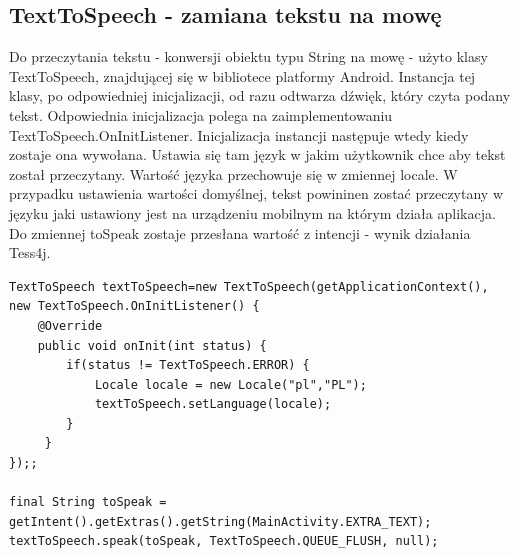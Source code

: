 \documentclass[eng,oneside]{mgr}
\begin{document}
\subsection{TextToSpeech - zamiana tekstu na mowę}
Do przeczytania tekstu - konwersji obiektu typu String na mowę - użyto klasy TextToSpeech, znajdującej się w bibliotece platformy Android. Instancja tej klasy, po odpowiedniej inicjalizacji, od razu odtwarza dźwięk, który czyta podany tekst. Odpowiednia inicjalizacja polega na zaimplementowaniu TextToSpeech.OnInitListener\cite{texttospeech}. Inicjalizacja instancji następuje wtedy kiedy zostaje ona wywołana. Ustawia się tam język w jakim użytkownik chce aby tekst został przeczytany. Wartość języka przechowuje się w zmiennej locale. W przypadku ustawienia wartości domyślnej, tekst powininen zostać przeczytany w języku jaki ustawiony jest na urządzeniu mobilnym na którym działa aplikacja. Do zmiennej toSpeak zostaje przesłana wartość z intencji - wynik działania Tess4j.
\begin{lstlisting}[caption={Kod programu, który odpowiada za przeczytanie tekstu z wykorzystaniem klasy TextToSpeech}]
TextToSpeech textToSpeech=new TextToSpeech(getApplicationContext(),
new TextToSpeech.OnInitListener() {
    @Override
    public void onInit(int status) {
        if(status != TextToSpeech.ERROR) {
            Locale locale = new Locale("pl","PL");
            textToSpeech.setLanguage(locale);
        }
     }
});;

final String toSpeak = getIntent().getExtras().getString(MainActivity.EXTRA_TEXT);
textToSpeech.speak(toSpeak, TextToSpeech.QUEUE_FLUSH, null);
\end{lstlisting}
\end{document}
